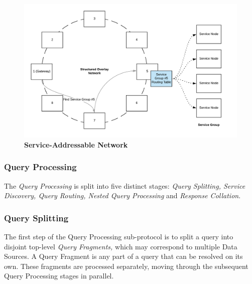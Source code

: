 \documentclass[12pt]{article}
\begin{document}
\begin{figure}[H]
\vspace*{5mm}
\caption{\textbf{Service-Addressable Network}}
\begin{center}
\includegraphics[width=1\textwidth]{media/image6.png}
\end{center}
\end{figure}
\subsubsection*{Query Processing}
The \textit{Query Processing} is split into five distinct stages: \textit{Query Splitting, Service Discovery, Query Routing, Nested Query Processing} and \textit{Response Collation}.
\subsubsection*{Query Splitting}
The first step of the Query Processing sub-protocol is to split a query into disjoint top-level \textit{Query Fragments,} which may correspond to multiple Data Sources. A Query Fragment is any part of a query that can be resolved on its own. These fragments are processed separately, moving through the subsequent Query Processing stages in parallel.
\end{document}
